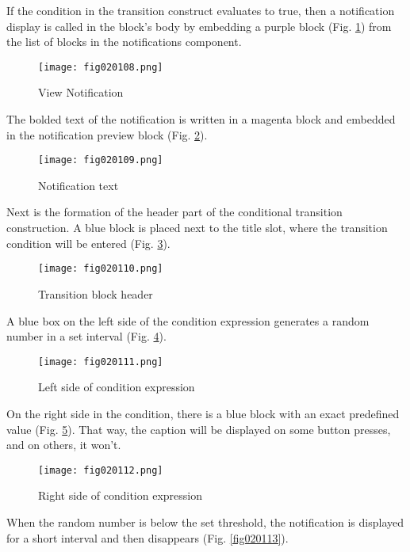 If the condition in the transition construct evaluates to true, then a notification display is called in the block's body by embedding a purple block (Fig. \ref{fig020108}) from the list of blocks in the notifications component.

\begin{figure}[H]
   \centering
   \texttt{[image: fig020108.png]}
   \caption{View Notification}
\label{fig020108}
\end{figure}

The bolded text of the notification is written in a magenta block and embedded in the notification preview block (Fig. \ref{fig020109}).

\begin{figure}[H]
   \centering
   \texttt{[image: fig020109.png]}
   \caption{Notification text}
\label{fig020109}
\end{figure}

Next is the formation of the header part of the conditional transition construction. A blue block is placed next to the title slot, where the transition condition will be entered (Fig. \ref{fig020110}).

\begin{figure}[H]
   \centering
   \texttt{[image: fig020110.png]}
   \caption{Transition block header}
\label{fig020110}
\end{figure}

A blue box on the left side of the condition expression generates a random number in a set interval (Fig. \ref{fig020111}).

\begin{figure}[H]
   \centering
   \texttt{[image: fig020111.png]}
   \caption{Left side of condition expression}
\label{fig020111}
\end{figure}

On the right side in the condition, there is a blue block with an exact predefined value (Fig. \ref{fig020112}). That way, the caption will be displayed on some button presses, and on others, it won't.

\begin{figure}[H]
   \centering
   \texttt{[image: fig020112.png]}
   \caption{Right side of condition expression}
\label{fig020112}
\end{figure}

When the random number is below the set threshold, the notification is displayed for a short interval and then disappears (Fig. \ref{fig020113}).


